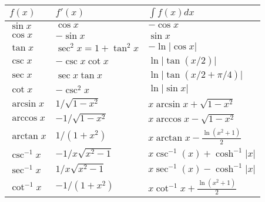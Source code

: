 \begin{tabular}{|l|l|l|}
\hline
    $f(x)$ & $f\prime(x)$ & $\int f(x) dx$ \\ \hline
    $\sin x$ & $\cos x$ & $-\cos x$ \\ \hline
    $\cos x$ & $-\sin x$ & $\sin x$ \\ \hline
    $\tan x$ & $\sec^2 x=1+\tan^2 x$ & $-\ln \vert \cos x \vert$ \\ \hline
    $\csc x$ & $-\csc x \cot x$ & $\ln \vert \tan(x/2) \vert$ \\ \hline
    $\sec x$ & $\sec x \tan x$ & $\ln \vert \tan(x/2+\pi/4) \vert$ \\ \hline
    $\cot x$ & $-\csc^2 x$ & $\ln \vert \sin x \vert$ \\ \hline
    $\arcsin x$ & $1/\sqrt{1-x^2}$ & $x \arcsin x + \sqrt{1-x^2}$ \\ \hline
    $\arccos x$ & $-1/\sqrt{1-x^2}$ & $x \arccos x - \sqrt{1-x^2}$ \\ \hline
    $\arctan x$ & $1/(1+x^2)$ & $x \arctan x - \frac{\ln(x^2+1)}{2}$ \\ \hline
    $\csc^{-1} x$ & $-1/x\sqrt{x^2-1}$ & $x \csc^{-1}(x) + \cosh^{-1} \vert x \vert$ \\ \hline
    $\sec^{-1} x$ & $1/x\sqrt{x^2-1}$ & $x \sec^{-1}(x) - \cosh^{-1} \vert x \vert$ \\ \hline
    $\cot^{-1} x$ & $-1/(1+x^2)$ & $x \cot^{-1} x + \frac{\ln(x^2+1)}{2}$ \\ \hline
\end{tabular}